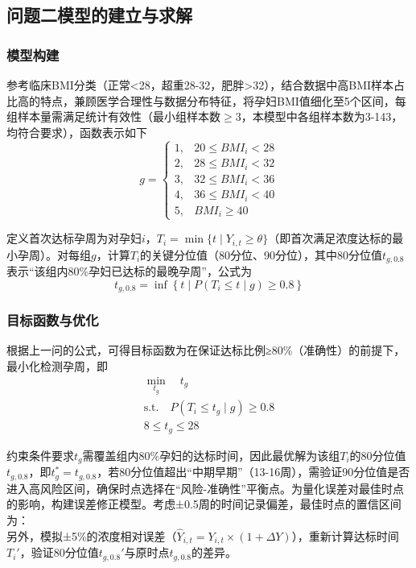 \documentclass[withoutpreface,bwprint]{cumcmthesis} %
\begin{document}

\subsection{问题二模型的建立与求解}

\subsubsection{模型构建} 
参考临床BMI分类（正常<28，超重28-32，肥胖>32），结合数据中高BMI样本占比高的特点，兼顾医学合理性与数据分布特征，将孕妇BMI值细化至5个区间，每组样本量需满足统计有效性（最小组样本数$\ge$3，本模型中各组样本数为3-143，均符合要求），函数表示如下
\begin{equation}
    g = \begin{cases} 
1, & 20 \leq BMI_i < 28 \\
2, & 28 \leq BMI_i < 32 \\
3, & 32 \leq BMI_i < 36 \\
4, & 36 \leq BMI_i < 40 \\
5, & BMI_i \geq 40 
\end{cases}
\end{equation}

定义首次达标孕周为对孕妇$i$，$T_i = \min\{t \mid Y_{i,t}≥\theta\}$（即首次满足浓度达标的最小孕周）。对每组$g$，计算$T_i$的关键分位值（80分位、90分位），其中80分位值$t_{g,0.8}$表示“该组内80\%孕妇已达标的最晚孕周”，公式为
\begin{equation}
    t_{g,0.8} = \inf\left\{ t \mid P(T_i \leq t \mid g) \geq 0.8 \right\}
\end{equation}

\subsubsection{目标函数与优化}
根据上一问的公式，可得目标函数为在保证达标比例≥80\%（准确性）的前提下，最小化检测孕周，即  
\begin{align}
\min_{t_g} \quad t_g \\
\text{s.t.} \quad P(T_i \leq t_g \mid g) \geq 0.8 \\
8 \leq t_g \leq 28
\end{align}



约束条件要求$t_g$需覆盖组内80\%孕妇的达标时间，因此最优解为该组$T_i$的80分位值$t_{g,0.8}$，即$t_g^* = t_{g,0.8}$，若80分位值超出“中期早期”（13-16周），需验证90分位值是否进入高风险区间，确保时点选择在“风险-准确性”平衡点。为量化误差对最佳时点的影响，构建误差修正模型。考虑±0.5周的时间记录偏差，最佳时点的置信区间为：  
\begin{equation}
[t_g^* - \Delta t, t_g^* + \Delta t]
\end{equation}
另外，模拟±5\%的浓度相对误差（$\hat{Y}_{i,t} = Y_{i,t} \times (1+\Delta Y)$），重新计算达标时间$T_i'$，验证80分位值$t_{g,0.8}'$与原时点$t_{g,0.8}$的差异。  
\end{document}
